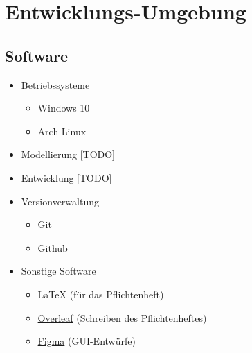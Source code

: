 \section{Entwicklungs-Umgebung}
    \subsection{Software}
        \begin{itemize}
            \item Betriebssysteme 
                \begin{itemize}
                    \item Windows 10
                    \item Arch Linux
                \end{itemize}
            \item Modellierung [TODO] 
            \item Entwicklung [TODO]
            \item Versionverwaltung
                \begin{itemize}
                    \item Git
                    \item Github
                \end{itemize}
            \item Sonstige Software
                \begin{itemize}
                    \item \LaTeX \hspace{0.1cm} (für das Pflichtenheft)
                    \item \href{https://de.overleaf.com}{Overleaf} (Schreiben des Pflichtenheftes)
                    \item \href{https://www.figma.com}{Figma} (GUI-Entwürfe)
                \end{itemize}
        \end{itemize}   